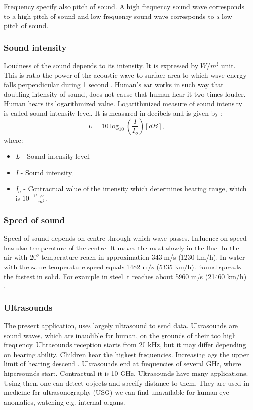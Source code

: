 \documentclass[11pt,titlepage]{article}
\theoremstyle{plain}
\begin{document}
Frequency specify also pitch of sound. A high frequency sound wave corresponds to a high pitch of sound and low frequency sound wave corresponds to a low pitch of sound.

\subsubsection{Sound intensity}
Loudness of the sound depends to its intensity. It is expressed by $W/m^2$ unit. This is ratio the power of the acoustic wave to surface area to which wave energy falls perpendicular during 1 second \cite{sound_intensity}. Human's ear works in such way that doubling intensity of sound, does not cause that human hear it two times louder. Human hears its logarithmized value. Logarithmized measure of sound intensity is called sound intensity level. It is measured in decibels and is given by \cite{decibels}:
\begin{equation}
	L = 10\log_{10}\left(\frac{I}{I_o}\right)  [dB],
\end{equation}
where:
\begin{itemize}
	\item $L$ - Sound intensity level,
	\item $I$ - Sound intensity,
	\item $I_o$ - Contractual value of the intensity which determines hearing range, which is $10^{-12}\frac{W}{m^2}.$
\end{itemize}
\subsubsection{Speed of sound}

Speed of sound depends on centre through which wave passes. Influence on speed has also temperature of the centre. It moves the most slowly in the flue. In the air with $20^o$ temperature reach in  approximation 343 m/s (1230 km/h). In water with the same temperature speed equals 1482 m/s (5335 km/h). Sound spreads the fastest in solid. For example in steel it reaches about 5960 m/s (21460 km/h) \cite{sound_speed}.

\subsubsection{Ultrasounds}
The present application, uses largely ultrasound to send data. Ultrasounds are sound waves, which are inaudible for human, on the grounds of their too high frequency. Ultrasounds reception starts from 20 kHz, but it may differ depending on hearing ability. Children hear the highest frequencies. Increasing age the upper limit of hearing descend \cite{limit_sound}. Ultrasounds end at frequencies of several GHz, where hipersounds start. Contractual it is 10 GHz. Ultrasounds have many applications. Using them one can detect objects and specify distance to them. They are used in medicine for ultrasonography (USG) we can find unavailable for human eye anomalies, watching e.g. internal organs. 
\end{document}
